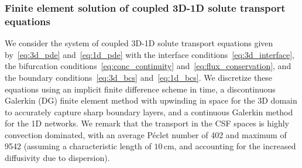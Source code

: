 \documentclass[fleqn,10pt]{wlscirep}
\begin{document}


\subsubsection{Finite element solution of coupled 3D-1D solute transport equations }

We consider the system of coupled 3D-1D solute transport equations
given by~\eqref{eq:3d_pde} and~\eqref{eq:1d_pde} with the interface
conditions~\eqref{eq:3d_interface}, the bifurcation
conditions~\eqref{eq:conc_continuity}
and~\eqref{eq:flux_conservation}, and the boundary
conditions~\eqref{eq:3d_bcs} and~\eqref{eq:1d_bcs}. We discretize
these equations using an implicit finite difference scheme in time, 
a discontinuous Galerkin (DG) finite element method with upwinding in space for the 3D domain to accurately capture sharp boundary layers, and a continuous Galerkin method for the 1D networks. We remark that the transport in the CSF spaces is highly convection dominated, with an average Péclet number of 402 and maximum of 9542 (assuming a characteristic length of $10\,$cm, and accounting for the increased diffusivity due to dispersion).
\end{document}
